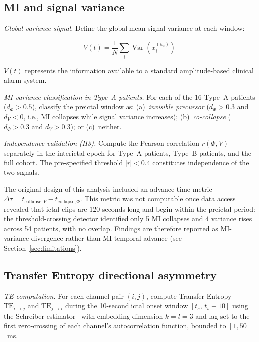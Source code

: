\documentclass[a4paper,fleqn]{cas-dc}
\begin{document}
\subsection{MI and signal variance}
\label{sec:mivariance}

\textit{Global variance signal.}
Define the global mean signal variance at each window:

\begin{equation}
  V(t) = \frac{1}{N} \sum_i \operatorname{Var}\!\left(x_i^{(w_t)}\right)
  \label{eq:variance}
\end{equation}

$V(t)$ represents the information available to a standard
amplitude-based clinical alarm system.

\textit{MI-variance classification in Type~A patients.}
For each of the 16 Type~A patients ($d_\Phi > 0.5$), classify the
preictal window as: (a)~\textit{invisible precursor} ($d_\Phi > 0.3$
and $d_V < 0$, i.e., MI collapses while signal variance increases);
(b)~\textit{co-collapse} ($d_\Phi > 0.3$ and $d_V > 0.3$); or
(c)~neither.

\textit{Independence validation (H3).}
Compute the Pearson correlation $r(\Phi, V)$ separately in the
interictal epoch for Type~A patients, Type~B patients, and the full
cohort.
%
The pre-specified threshold $|r| < 0.4$ constitutes independence of
the two signals.

The original design of this analysis included an advance-time metric
$\Delta\tau = t_{\text{collapse},V} - t_{\text{collapse},\Phi}$.
%
This metric was not computable once data access revealed that ictal
clips are 120 seconds long and begin within the preictal period: the
threshold-crossing detector identified only 5 MI collapses and 4
variance rises across 54 patients, with no overlap.
%
Findings are therefore reported as MI-variance divergence rather than
MI temporal advance (see Section~\ref{sec:limitations}).

\subsection{Transfer Entropy directional asymmetry}
\label{sec:te}

\textit{TE computation.}
For each channel pair $(i, j)$, compute Transfer Entropy
$\mathrm{TE}_{i \to j}$ and $\mathrm{TE}_{j \to i}$ during the
10-second ictal onset window $[t_s,\, t_s + 10]$ using the Schreiber
estimator~\citep{schreiber2000,wibral2014} with embedding dimension $k = l = 3$
and lag set to the first zero-crossing of each channel's
autocorrelation function, bounded to $[1, 50]$~ms.
\end{document}
